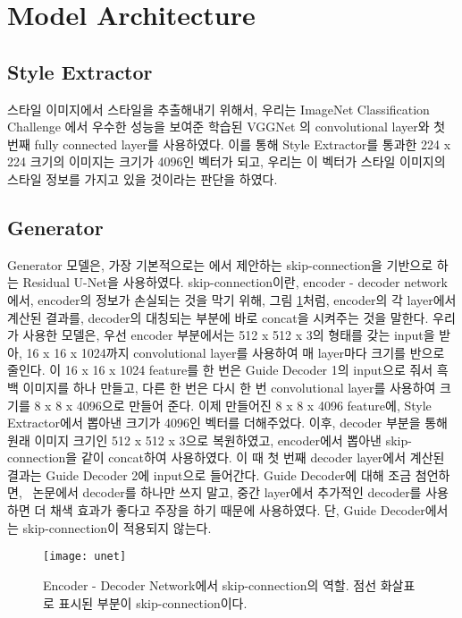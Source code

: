\section{Model Architecture}
\label{sec:archi}

\subsection{Style Extractor}

스타일 이미지에서 스타일을 추출해내기 위해서, 우리는 ImageNet Classification Challenge \cite{Deng2009ImageNet}에서 우수한 성능을 보여준 학습된 VGGNet \cite{Simonyan2014}의 convolutional layer와 첫 번째 fully connected layer를 사용하였다.
이를 통해 Style Extractor를 통과한 224 x 224 크기의 이미지는 크기가 4096인 벡터가 되고, 우리는 이 벡터가 스타일 이미지의 스타일 정보를 가지고 있을 것이라는 판단을 하였다.
\subsection{Generator}

Generator 모델은, 가장 기본적으로는 \stylepaint 에서 제안하는 skip-connection을 기반으로 하는 Residual U-Net을 사용하였다.
skip-connection이란, encoder - decoder network에서, encoder의 정보가 손실되는 것을 막기 위해, 그림 \ref{fig:unet}처럼, encoder의 각 layer에서 계산된 결과를, decoder의 대칭되는 부분에 바로 concat을 시켜주는 것을 말한다.
우리가 사용한 모델은, 우선 encoder 부분에서는 512 x 512 x 3의 형태를 갖는 input을 받아, 16 x 16 x 1024까지 convolutional layer를 사용하여 매 layer마다 크기를 반으로 줄인다.
이 16 x 16 x 1024 feature를 한 번은 Guide Decoder 1의 input으로 줘서 흑백 이미지를 하나 만들고, 다른 한 번은 다시 한 번 convolutional layer를 사용하여 크기를 8 x 8 x 4096으로 만들어 준다.
이제 만들어진 8 x 8 x 4096 feature에, Style Extractor에서 뽑아낸 크기가 4096인 벡터를 더해주었다.
이후, decoder 부분을 통해 원래 이미지 크기인 512 x 512 x 3으로 복원하였고, encoder에서 뽑아낸 skip-connection을 같이 concat하여 사용하였다.
이 때 첫 번째 decoder layer에서 계산된 결과는 Guide Decoder 2에 input으로 들어간다. Guide Decoder에 대해 조금 첨언하면, \stylepaint~논문에서 decoder를 하나만 쓰지 말고, 중간 layer에서 추가적인 decoder를 사용하면 더 채색 효과가 좋다고 주장을 하기 때문에 사용하였다.
단, Guide Decoder에서는 skip-connection이 적용되지 않는다.

\begin{figure}[t]
	\centering
	\texttt{[image: unet]}
	\caption{Encoder - Decoder Network에서 skip-connection의 역할. 점선 화살표로 표시된 부분이 skip-connection이다.}
	\label{fig:unet}
\end{figure}


